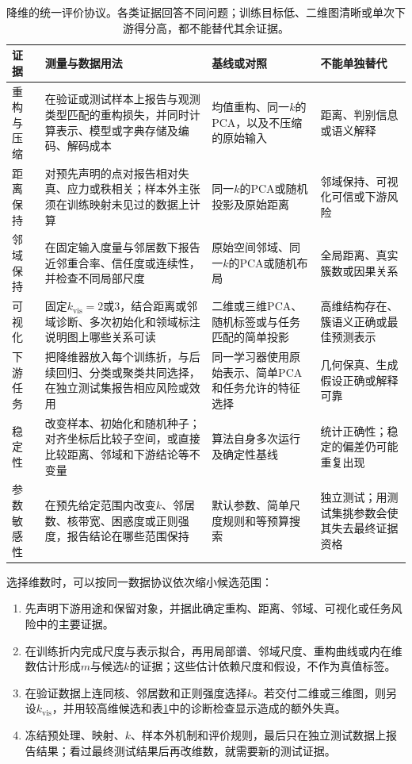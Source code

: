 \begin{table}[!htbp]
  \centering
  \small
  \begin{tabularx}{\linewidth}{@{}>{\RaggedRight\arraybackslash}p{23mm}>{\RaggedRight\arraybackslash}p{58mm}>{\RaggedRight\arraybackslash}X>{\RaggedRight\arraybackslash}X@{}}
    \toprule
    证据 & 测量与数据用法 & 基线或对照 & 不能单独替代 \\
    \midrule
    重构与压缩
      & 在验证或测试样本上报告与观测类型匹配的重构损失，并同时计算表示、模型或字典存储及编码、解码成本
      & 均值重构、同一$k$的PCA，以及不压缩的原始输入
      & 距离、判别信息或语义解释 \\
    距离保持
      & 对预先声明的点对报告相对失真、应力或秩相关；样本外主张须在训练映射未见过的数据上计算
      & 同一$k$的PCA或随机投影及原始距离
      & 邻域保持、可视化可信或下游风险 \\
    邻域保持
      & 在固定输入度量与邻居数下报告近邻重合率、信任度或连续性，并检查不同局部尺度
      & 原始空间邻域、同一$k$的PCA或随机布局
      & 全局距离、真实簇数或因果关系 \\
    可视化
      & 固定$k_{\mathrm{vis}}=2$或$3$，结合距离或邻域诊断、多次初始化和领域标注说明图上哪些关系可读
      & 二维或三维PCA、随机标签或与任务匹配的简单投影
      & 高维结构存在、簇语义正确或最佳预测表示 \\
    下游任务
      & 把降维器放入每个训练折，与后续回归、分类或聚类共同选择，在独立测试集报告相应风险或效用
      & 同一学习器使用原始表示、简单PCA和任务允许的特征选择
      & 几何保真、生成假设正确或解释可靠 \\
    稳定性
      & 改变样本、初始化和随机种子；对齐坐标后比较子空间，或直接比较距离、邻域和下游结论等不变量
      & 算法自身多次运行及确定性基线
      & 统计正确性；稳定的偏差仍可能重复出现 \\
    参数敏感性
      & 在预先给定范围内改变$k$、邻居数、核带宽、困惑度或正则强度，报告结论在哪些范围保持
      & 默认参数、简单尺度规则和等预算搜索
      & 独立测试；用测试集挑参数会使其失去最终证据资格 \\
    \bottomrule
  \end{tabularx}
  \caption{降维的统一评价协议。各类证据回答不同问题；训练目标低、二维图清晰或单次下游得分高，都不能替代其余证据。}
  \label{tab:dim-evaluation-protocol}
\end{table}

选择维数时，可以按同一数据协议依次缩小候选范围：
\begin{enumerate}
  \item 先声明下游用途和保留对象，并据此确定重构、距离、邻域、可视化或任务风险中的主要证据。
  \item 在训练折内完成尺度与表示拟合，再用局部谱、邻域尺度、重构曲线或内在维数估计形成$m$与候选$k$的证据；这些估计依赖尺度和假设，不作为真值标签。
  \item 在验证数据上连同核、邻居数和正则强度选择$k$。若交付二维或三维图，则另设$k_{\mathrm{vis}}$，并用较高维候选和表\ref{tab:dim-evaluation-protocol}中的诊断检查显示造成的额外失真。
  \item 冻结预处理、映射、$k$、样本外机制和评价规则，最后只在独立测试数据上报告结果；看过最终测试结果后再改维数，就需要新的测试证据。
\end{enumerate}

